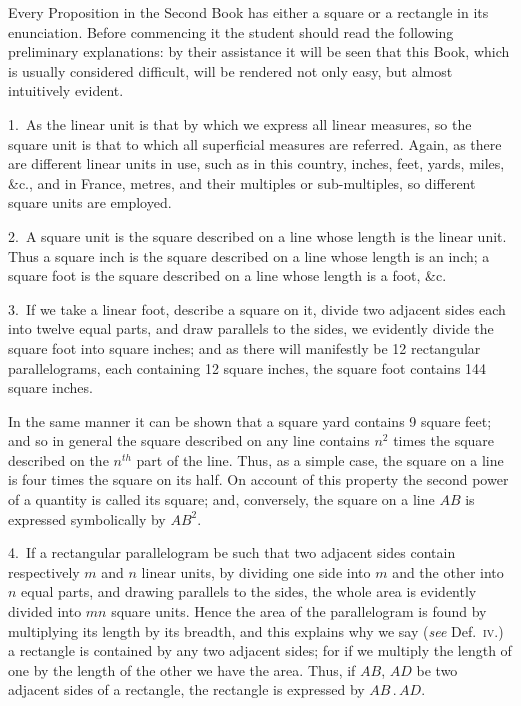 \documentclass[oneside]{book}
\begin{document}
\noindent Every Proposition in the Second Book has either a
square or a rectangle in its enunciation. Before commencing
it the student should read the following preliminary
explanations: by their assistance it will be
seen that this Book, which is usually considered difficult,
will be rendered not only easy, but almost intuitively
evident.\par\medskip

\begin{footnotesize}
1.~As the linear unit is that by which we express all
linear measures, so the square unit is that to which all
superficial measures are referred. Again, as there are
different linear units in use, such as in this country,
inches, feet, yards, miles, \&c., and in France, metres,
and their multiples or sub-multiples, so different square
units are employed.

2.~A square unit is the square described on a line
whose length is the linear unit. Thus a square inch is
the square described on a line whose length is an inch;
a square foot is the square described on a line whose
length is a foot, \&c.

3.~If we take a linear foot, describe a square on it,
divide two adjacent sides each into twelve equal parts,
and draw parallels to the sides, we evidently divide the
square foot into square inches; and as there will manifestly
be 12 rectangular parallelograms, each containing
12 square inches, the square foot contains 144
square inches.


In the same manner it can be shown that a square
yard contains 9 square feet; and so in general the
square described on any line contains $n^2$ times the
square described on the $n^{th}$ part of the line. Thus, as
a simple case, the square on a line is four times the
square on its half. On account of this property the
second power of a quantity is called its square; and,
conversely, the square on a line $AB$ is expressed symbolically
by $AB^2$.

4.~If a rectangular parallelogram be such that two
adjacent sides contain respectively $m$ and $n$ linear units,
by dividing one side into $m$ and the other into $n$ equal
parts, and drawing parallels to the sides, the whole area
is evidently divided into $mn$ square units. Hence the
area of the parallelogram is found by multiplying its
length by its breadth, and this explains why we say
(\emph{see} Def.~\textsc{iv}.) a rectangle is contained by any two adjacent
sides; for if we multiply the length of one by
the length of the other we have the area. Thus, if
$AB$, $AD$ be two adjacent sides of a rectangle, the rectangle
is expressed by $AB\,.\,AD$.
\par\end{footnotesize}
\end{document}
